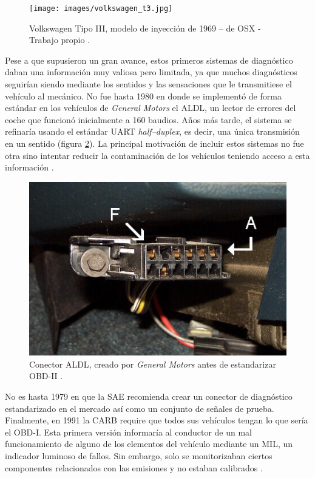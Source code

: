 \begin{figure}[H]
  \centering
  \texttt{[image: images/volkswagen\_t3.jpg]}
  \caption{Volkswagen Tipo III, modelo de inyección de 1969 -- de OSX - Trabajo propio \cite{VolkswagenTipo2021}.}
  \label{fig:volkswagen_t3}
\end{figure}

Pese a que supusieron un gran avance, estos primeros sistemas de
diagnóstico daban una información muy valiosa pero limitada, ya que muchos
diagnósticos seguirían siendo mediante los sentidos y las sensaciones
que le transmitiese el vehículo al mecánico. No fue hasta 1980 en donde
se implementó de forma estándar en los vehículos de \textit{General Motors}
el \ac{ALDL}, un lector de errores del coche que funcionó inicialmente a
160 baudios. Años más tarde, el sistema se refinaría usando el estándar
\ac{UART} \textit{half--duplex}, es decir, una única transmisión en
un sentido (figura \ref{fig:aldl}). La principal motivación de incluir estos sistemas no fue
otra sino intentar reducir la contaminación de los vehículos teniendo
acceso a esta información \cite{SistemaOBD2Historia}.

\begin{figure}[H]
  \centering
  \includegraphics[width=.75\linewidth]{images/aldl.jpg}
  \caption{Conector \ac{ALDL}, creado por \textit{General Motors} antes de
  estandarizar OBD-II \cite{ReferenceManualChapter}.}
  \label{fig:aldl}
\end{figure}

No es hasta 1979 en que la \ac{SAE} recomienda crear un conector de
diagnóstico estandarizado en el mercado así como un conjunto de señales
de prueba. Finalmente, en 1991 la \ac{CARB} require que todos sus
vehículos tengan lo que sería el \ac{OBD}-I. Esta primera versión informaría
al conductor de un mal funcionamiento de alguno de los elementos del
vehículo mediante un \ac{MIL}, un indicador luminoso de fallos. Sin
embargo, solo se monitorizaban ciertos componentes relacionados con las
emisiones y no estaban calibrados \cite{SistemaOBD2Historia}.

